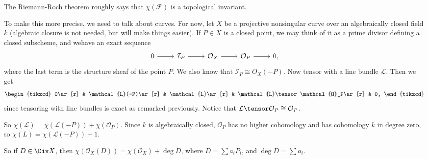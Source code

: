 The Riemann-Roch theorem roughly says that $\chi(\mathcal{F})$ is a topological
invariant.

To make this more precise, we need to talk about curves. For now, let $X$ be a
projective nonsingular curve over an algebraically closed field $k$ (algebraic
closure is not needed, but will make things easier). If $P \in X$ is a closed point,
we may think of it as a prime divisor defining a closed subscheme, and wehave
an exact sequence
\[\begin{tikzcd}
	 0\ar[r] & \mathcal{I}_P\ar[r] & \mathcal{O}_X\ar[r] & \mathcal{O}_P\ar[r] & 0,
 \end{tikzcd}\]
where the last term is the structure sheaf of the point $P$. We also know that
$\mathcal{I}_P \cong O_X(-P)$. Now tensor with a line bundle $\mathcal{L}$. Then
we get
\[\begin{tikzcd}
	0\ar[r] & \mathcal{L}(-P)\ar[r] & \mathcal{L}\ar[r] & \mathcal{L}\tensor \mathcal{O}_P\ar[r] & 0,
\end{tikzcd}\]
since tensoring with line bundles is exact as remarked previously. Notice that
$\mathcal{L}\tensor \mathcal{O}_P\cong \mathcal{O}_P$.

So $\chi(\mathcal{L}) = \chi(\mathcal{L}(-P)) + \chi(\mathcal{O}_P)$.
Since $k$ is algebraically closed, $\mathcal{O}_P$ has no higher cohomology
and has cohomology $k$ in degree zero, so $\chi(L) = \chi(\mathcal{L}(-P)) + 1$.

So if $D \in \Div X$, then $\chi(\mathcal{O}_X(D)) = \chi(\mathcal{O}_X) + \deg D$,
where $D = \sum a_iP_i$, and $\deg D = \sum a_i$.

